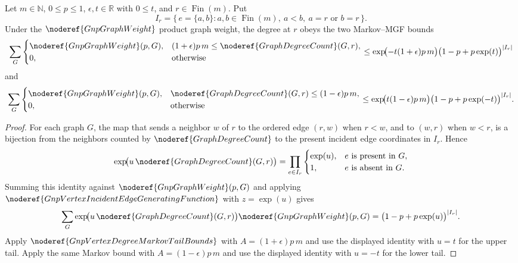 \begin{helper}[GnpVertexDegreeUpperTailUnionBound]
Let \(m\in\mathbb N\), \(0\le p\le 1\), \(\epsilon,t\in\mathbb R\) with
\(0\le t\), and \(r\in\operatorname{Fin}(m)\).  Put
\[
I_r=\{\,e=\{a,b\}: a,b\in\operatorname{Fin}(m),\ a<b,\ a=r
\text{ or } b=r\,\}.
\]
Under the \(\noderef{GnpGraphWeight}\) product graph weight, the degree at
\(r\) obeys the two Markov--MGF bounds
\[
\sum_G
\begin{cases}
\noderef{GnpGraphWeight}(p,G),
&(1+\epsilon)p\,m\le \noderef{GraphDegreeCount}(G,r),\\
0,&\text{otherwise}
\end{cases}
\le
\exp\!\bigl(-t(1+\epsilon)p\,m\bigr)
\bigl(1-p+p\exp(t)\bigr)^{|I_r|}
\]
and
\[
\sum_G
\begin{cases}
\noderef{GnpGraphWeight}(p,G),
&\noderef{GraphDegreeCount}(G,r)\le (1-\epsilon)p\,m,\\
0,&\text{otherwise}
\end{cases}
\le
\exp\!\bigl(t(1-\epsilon)p\,m\bigr)
\bigl(1-p+p\exp(-t)\bigr)^{|I_r|}.
\]
\end{helper}
\begin{proof}
For each graph \(G\), the map that sends a neighbor \(w\) of \(r\) to the
ordered edge \((r,w)\) when \(r<w\), and to \((w,r)\) when \(w<r\), is a
bijection from the neighbors counted by \(\noderef{GraphDegreeCount}\) to the
present incident edge coordinates in \(I_r\).  Hence
\[
\exp\!\bigl(u\,\noderef{GraphDegreeCount}(G,r)\bigr)
=
\prod_{e\in I_r}
\begin{cases}
\exp(u),&e\text{ is present in }G,\\
1,&e\text{ is absent in }G.
\end{cases}
\]
Summing this identity against \(\noderef{GnpGraphWeight}(p,G)\) and applying
\(\noderef{GnpVertexIncidentEdgeGeneratingFunction}\) with \(z=\exp(u)\)
gives
\[
\sum_G \exp\!\bigl(u\,\noderef{GraphDegreeCount}(G,r)\bigr)
\noderef{GnpGraphWeight}(p,G)
=
\bigl(1-p+p\exp(u)\bigr)^{|I_r|}.
\]
Apply \(\noderef{GnpVertexDegreeMarkovTailBounds}\) with
\(A=(1+\epsilon)p\,m\) and use the displayed identity with \(u=t\) for the
upper tail.  Apply the same Markov bound with \(A=(1-\epsilon)p\,m\) and use
the displayed identity with \(u=-t\) for the lower tail.
\end{proof}
